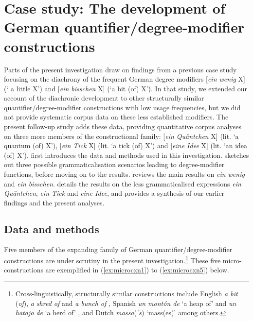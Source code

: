 \documentclass[output=paper]{langsci/langscibook}
\begin{document}
\section{Case study: The development of German quantifier\slash degree\hyp{}modifier constructions} \label{sec3}

Parts of the present investigation draw on findings from a previous case study {\citep{NeelsReductionexpansionbit2018}} focusing on the diachrony of the frequent German degree modifiers [\textit{ein wenig} X] (‘ a little X’) and [\textit{ein bisschen} X] (‘a bit (of) X’). In that study, we extended our account of the diachronic development to other structurally similar quantifier\slash degree\hyp{}modifier constructions with low usage frequencies, but we did not provide systematic corpus data on these less established modifiers. The present follow-up study adds these data, providing quantitative corpus analyses on three more members of the constructional family: [\textit{ein Quäntchen} X] (lit. ‘a quantum (of) X’), [\textit{ein Tick} X] (lit. ‘a tick (of) X’) and [\textit{eine Idee} X] (lit. ‘an idea (of) X’).  first introduces the data and methods used in this investigation.  sketches out three possible grammaticalisation scenarios leading to degree\hyp{}modifier functions, before moving on to the results.  reviews the main results on \textit{ein wenig} and \textit{ein bisschen}.  details the results on the less grammaticalised expressions \textit{ein Quäntchen}, \textit{ein Tick} and \textit{eine Idee}, and provides a synthesis of our earlier findings and the present analyses. 

\subsection{Data and methods} \label{sec3-1}

Five members of the expanding family of German quantifier\slash degree\hyp{}modifier constructions are under scrutiny in the present investigation.\footnote{Cross-linguistically, structurally similar constructions include English \textit{a bit} (\textit{of}), \textit{a shred of} and \textit{a bunch of} \citep[e.g.][]{BremsGrammaticalizationSmallSize2007, TraugottGrammaticalizationNPNP2008, Shao2019}, Spanish \textit{un montón de} 
`a heap of' and \textit{un hatajo de} `a herd of' \citep[e.g.][]{VerveckkenBinominalquantifiersSpanish2015}, and Dutch \textit{massa}(\textit{'s}) `mass(es)' \citep[e.g.][]{DeClercknounintensifiermassa2013} among others.}  These five micro\hyp{}constructions are exemplified in (\ref{ex:microcxn1}) to (\ref{ex:microcxn5}) below. 
\end{document}
